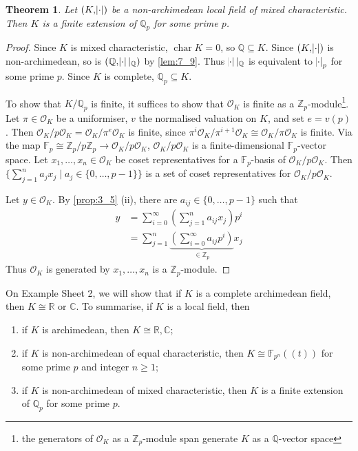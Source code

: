 \documentclass[11pt]{article}
\theoremstyle{definition}
\theoremstyle{plain}
\newtheorem{theorem}[definition]{Theorem}
\theoremstyle{remark}
\DeclareMathOperator{\Char}{char}
\newcommand{\FF}{\mathbb{F}}
\newcommand{\ZZ}{\mathbb{Z}}
\newcommand{\QQ}{\mathbb{Q}}
\newcommand{\RR}{\mathbb{R}}
\newcommand{\CC}{\mathbb{C}}
\newcommand{\cO}{\mathcal{O}}
\begin{document}
\begin{theorem}\label{thm:7_11}
    Let $(K, \abs{\cdot})$ be a non-archimedean local field of mixed characteristic. Then $K$ is a finite extension of $\QQ_p$ for some prime $p$.
\end{theorem}
\begin{proof}
    Since $K$ is mixed characteristic, $\Char{K} = 0$, so $\QQ \subseteq K$. Since $(K, \abs{\cdot})$ is non-archimedean, so is $(\QQ, \abs{\cdot} \vert_\QQ)$ by \autoref{lem:7_9}. Thus $\abs{\cdot} \vert_\QQ$ is equivalent to $\abs{\cdot}_p$ for some prime $p$. Since $K$ is complete, $\QQ_p \subseteq K$.

    To show that $K / \QQ_p$ is finite, it suffices to show that $\cO_K$ is finite as a $\ZZ_p$-module\footnote{the generators of $\cO_K$ as a $\ZZ_p$-module span generate $K$ as a $\QQ$-vector space}. Let $\pi \in \cO_K$ be a uniformiser, $v$ the normalised valuation on $K$, and set $e = v(p)$. Then $\cO_K / p \cO_K = \cO_K / \pi^e \cO_K$ is finite, since $\pi^i \cO_K / \pi^{i+1} \cO_K \cong \cO_K / \pi \cO_K$ is finite. Via the map $\FF_p \cong \ZZ_p / p \ZZ_p \to \cO_K / p \cO_K$, $\cO_K / p \cO_K$ is a finite-dimensional $\FF_p$-vector space. Let $x_1, \ldots, x_n \in \cO_K$ be coset representatives for a $\FF_p$-basis of $\cO_K / p \cO_K$. Then $\{\sum_{j=1}^n a_j x_j \mid a_j \in \{0, \ldots, p-1\}\}$ is a set of coset representatives for $\cO_K / p \cO_K$.

    Let $y \in \cO_K$. By \autoref{prop:3_5} (ii), there are $a_{ij} \in \{0, \ldots, p-1\}$ such that
    \begin{align*}
        y
        &= \sum_{i=0}^\infty \left(\sum_{j=1}^n a_{ij} x_j\right) p^i\\
        &= \sum_{j=1}^n \underbrace{\left(\sum_{i=0}^\infty a_{ij} p^i\right)}_{\in \ZZ_p} x_j
    \end{align*}
    Thus $\cO_K$ is generated by $x_1, \ldots, x_n$ is a $\ZZ_p$-module.
\end{proof}

On Example Sheet 2, we will show that if $K$ is a complete archimedean field, then $K \cong \RR$ or $\CC$. To summarise, if $K$ is a local field, then
\begin{enumerate}
    \item if $K$ is archimedean, then $K \cong \RR, \CC$;
    \item if $K$ is non-archimedean of equal characteristic, then $K \cong \FF_{p^n}((t))$ for some prime $p$ and integer $n \ge 1$;
    \item if $K$ is non-archimedean of mixed characteristic, then $K$ is a finite extension of $\QQ_p$ for some prime $p$.
\end{enumerate}
\end{document}
